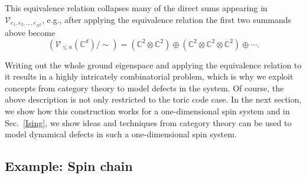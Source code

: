 \documentclass[aps,prx,twocolumn,superscriptaddress,noshowkeys]{revtex4-2}  %
\theoremstyle{plain}%
\theoremstyle{definition}
\theoremstyle{remark}
\begin{document}
This equivalence relation collapses many of the direct sums appearing in $\mathcal{V}_{e_1,e_2,\ldots,e_{N^2}}$, e.g., after applying the equivalence relation the first two summands above become
\begin{equation}
\left(\mathcal{V}_{\le n}(\mathbb{C}^d)/\sim\right) = (\mathbb{C}^2\otimes \mathbb{C}^2)\oplus (\mathbb{C}^2\otimes \mathbb{C}^2\otimes \mathbb{C}^2)\oplus \cdots.
\end{equation}

Writing out the whole ground eigenspace and applying the equivalence relation to it results in a highly intricately combinatorial problem, which is why we exploit concepts from category theory to model defects in the system. Of course, the above description is not only restricted to the toric code case. In the next section, we show how this construction works for a one-dimensional spin system and in Sec.~\ref{Ising}, we show ideas and techniques from category theory can be used to model dynamical defects in such a one-dimensional spin system.


\subsection{Example: Spin chain}
\label{subsec:VecZ2}
\end{document}
